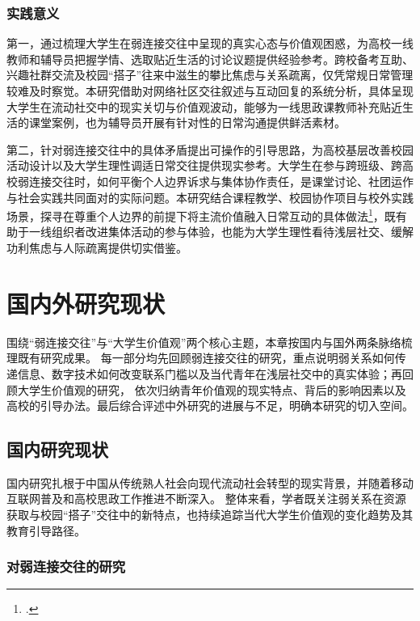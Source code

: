 \subsubsection{实践意义}

第一，通过梳理大学生在弱连接交往中呈现的真实心态与价值观困惑，为高校一线教师和辅导员把握学情、选取贴近生活的讨论议题提供经验参考。跨校备考互助、兴趣社群交流及校园“搭子”往来中滋生的攀比焦虑与关系疏离，仅凭常规日常管理较难及时察觉。本研究借助对网络社区交往叙述与互动回复的系统分析，具体呈现大学生在流动社交中的现实关切与价值观波动，能够为一线思政课教师补充贴近生活的课堂案例，也为辅导员开展有针对性的日常沟通提供鲜活素材。

第二，针对弱连接交往中的具体矛盾提出可操作的引导思路，为高校基层改善校园活动设计以及大学生理性调适日常交往提供现实参考。大学生在参与跨班级、跨高校弱连接交往时，如何平衡个人边界诉求与集体协作责任，是课堂讨论、社团运作与社会实践共同面对的实际问题。本研究结合课程教学、校园协作项目与校外实践场景，探寻在尊重个人边界的前提下将主流价值融入日常互动的具体做法\footcite{Shen2021_narrative}，既有助于一线组织者改进集体活动的参与体验，也能为大学生理性看待浅层社交、缓解功利焦虑与人际疏离提供切实借鉴。

\section{国内外研究现状}
\label{sec:research-status}

围绕“弱连接交往”与“大学生价值观”两个核心主题，本章按国内与国外两条脉络梳理既有研究成果。
每一部分均先回顾弱连接交往的研究，重点说明弱关系如何传递信息、数字技术如何改变联系门槛以及当代青年在浅层社交中的真实体验；再回顾大学生价值观的研究，
依次归纳青年价值观的现实特点、背后的影响因素以及高校的引导办法。最后综合评述中外研究的进展与不足，明确本研究的切入空间。

\subsection{国内研究现状}
\label{sec:domestic-research}

国内研究扎根于中国从传统熟人社会向现代流动社会转型的现实背景，并随着移动互联网普及和高校思政工作推进不断深入。
整体来看，学者既关注弱关系在资源获取与校园“搭子”交往中的新特点，也持续追踪当代大学生价值观的变化趋势及其教育引导路径。

\subsubsection{对弱连接交往的研究}

